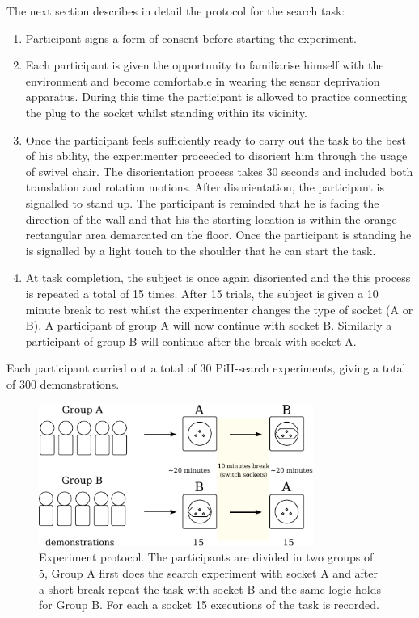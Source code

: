 The next section describes in detail the protocol for the search task:

\begin{enumerate}
 \item Participant signs a form of consent before starting the experiment.
 \item Each participant is given the opportunity to familiarise himself with the environment and become 
 comfortable in wearing the sensor deprivation apparatus.
 During this time the participant is allowed to practice connecting the plug to the socket whilst standing within its vicinity.  
 \item Once the participant feels sufficiently ready to carry out the task to the best of his ability, the experimenter 
  proceeded to disorient him through the usage of swivel chair. The disorientation process takes 30 seconds and included 
  both translation and rotation motions. After disorientation, the participant is signalled to stand up. The participant
  is reminded that he is facing the direction of the wall and that his the starting location is within the orange 
  rectangular area demarcated on the floor. Once the participant is standing he is signalled by a light touch to the shoulder 
  that he can start the task.
  \item At task completion, the subject is once again disoriented and the this process is repeated a total of 15 times.
  After 15 trials, the subject is given a 10 minute break to rest whilst the experimenter changes the type of socket (A or B). 
  A participant of group A will now continue with socket B. Similarly a participant of group B will continue after the break 
  with socket A.
\end{enumerate}

Each participant carried out a total of 30 PiH-search experiments, giving a total of 300 demonstrations.

\begin{figure}
\centering
 \includegraphics[width=0.8\textwidth]{./ch4-PiH/Figures/Fig/experiment_design_v2.pdf}
 \caption{Experiment protocol. The participants are divided in two groups of 5, Group A first does the search 
 experiment with socket A and after a short break repeat the task with socket B and the same logic holds for Group B.
 For each a socket 15 executions of the task is recorded.}
 \label{fig:experiment_design}
\end{figure}

